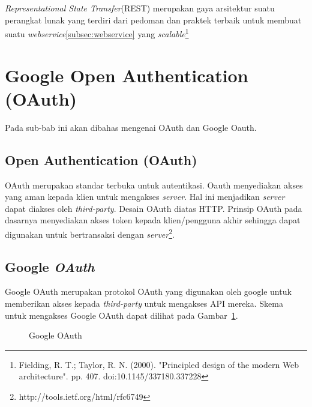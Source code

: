 \textit{Representational State Transfer}(REST) merupakan gaya arsitektur suatu perangkat lunak yang terdiri dari pedoman dan praktek terbaik untuk membuat suatu \textit{webservice}\ref{subsec:webservice} yang \textit{scalable}\footnote{Fielding, R. T.; Taylor, R. N. (2000). "Principled design of the modern Web architecture". pp. 407. doi:10.1145/337180.337228}

\section{Google Open Authentication (OAuth)}
\label{sec:googleopenauthentication}

Pada sub-bab ini akan dibahas mengenai OAuth dan Google Oauth.

\subsection{Open Authentication (OAuth)}
\label{subsec:oauth}

\hspace{0,5cm}OAuth merupakan standar terbuka untuk autentikasi. Oauth menyediakan akses yang aman kepada klien untuk mengakses \textit{server}. Hal ini menjadikan \textit{server} dapat diakses oleh \textit{third-party}. Desain OAuth diatas HTTP. Prinsip OAuth pada dasarnya menyediakan akses token kepada klien/pengguna akhir sehingga dapat digunakan untuk bertransaksi dengan \textit{server}\footnote{http://tools.ietf.org/html/rfc6749}.

\subsection{Google \textit{OAuth}}
\label{subsec:googleip}

\hspace{0,5cm}Google OAuth merupakan protokol OAuth yang digunakan oleh google untuk memberikan akses kepada \textit{third-party} untuk mengakses API mereka. Skema untuk mengakses Google OAuth dapat dilihat pada Gambar~\ref{fig:google_oauth}.

\begin{figure}
\centering
{}
\caption[Google OAuth]{Google OAuth} 
\label{fig:google_oauth}
\end{figure}

